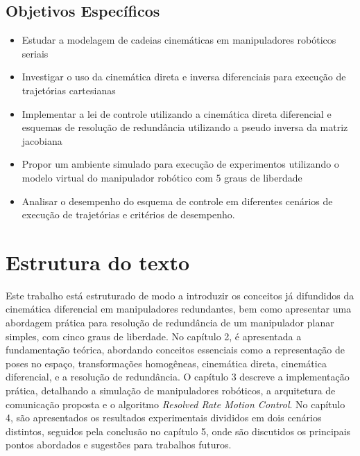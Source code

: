 \subsection{Objetivos Específicos}
\begin{itemize}
	\item Estudar a modelagem de cadeias cinemáticas em manipuladores robóticos seriais
	\item Investigar o uso da cinemática direta e inversa diferenciais para execução de trajetórias cartesianas
	\item Implementar a lei de controle utilizando a cinemática direta diferencial e esquemas de resolução de redundância utilizando a pseudo inversa da matriz jacobiana
	\item Propor um ambiente simulado para execução de experimentos utilizando o modelo virtual do manipulador robótico com 5 graus de liberdade
	\item Analisar o desempenho do esquema de controle em diferentes cenários de execução de trajetórias e critérios de desempenho.
\end{itemize}

\section{Estrutura do texto}\label{sec:structure}

Este trabalho está estruturado de modo a introduzir os conceitos já difundidos da cinemática diferencial em manipuladores redundantes,
bem como apresentar uma abordagem prática para resolução de redundância de um manipulador planar simples, com cinco graus de liberdade.
No capítulo 2, é apresentada a fundamentação teórica, abordando conceitos essenciais como a representação de poses no
espaço, transformações homogêneas, cinemática direta, cinemática diferencial, e a resolução de redundância.
O capítulo 3 descreve a implementação prática, detalhando a simulação de manipuladores robóticos, a arquitetura de comunicação proposta
e o algoritmo \emph{Resolved Rate Motion Control}. No capítulo 4, são apresentados os resultados experimentais divididos em dois cenários
distintos, seguidos pela conclusão no capítulo 5, onde são discutidos os principais pontos abordados e sugestões para trabalhos futuros.
